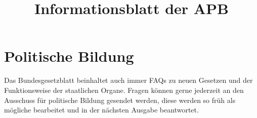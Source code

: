 \documentclass{sasbase}
\begin{document}
\title{Informationsblatt der APB}

\setcounter{secnumdepth}{5}

\mytitle

\parensstyle

\section{Politische Bildung}
Das Bundesgesetzblatt beinhaltet auch immer FAQs zu neuen Gesetzen und der Funktionsweise der staatlichen Organe.
Fragen k\"{o}nnen gerne jederzeit an den Ausschuss f\"{u}r politische Bildung gesendet werden, diese werden so fr\"{u}h als m\"{o}gliche bearbeitet und in der n\"{a}chsten Ausgabe beantwortet.
\end{document}
